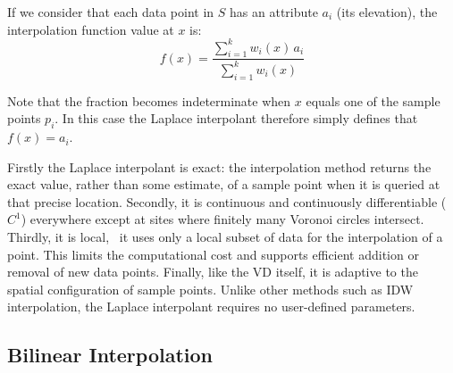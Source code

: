 %

If we consider that each data point in $S$ has an attribute $a_{i}$ (its elevation), the interpolation function value at $x$ is:
\begin{equation}
  f(x) = \frac{\sum_{i=1}^{k} w_{i}(x) \, a_{i}}{\sum_{i=1}^{k} w_{i}(x)}
  \label{eq:laplace2}
\end{equation}

Note that the fraction becomes indeterminate when $x$ equals one of the sample points $p_i$. 
In this case the Laplace interpolant therefore simply defines that $f(x) = a_i$.

%

Firstly the Laplace interpolant is exact: the interpolation method returns the exact value, rather than some estimate, of a sample point when it is queried at that precise location. 
Secondly, it is continuous and continuously differentiable ($C^1$) everywhere except at sites where finitely many Voronoi circles intersect. 
Thirdly, it is local, \ie\ it uses only a local subset of data for the interpolation of a point. 
This limits the computational cost and supports efficient addition or removal of new data points. 
Finally, like the VD itself, it is adaptive to the spatial configuration of sample points. 
Unlike other methods such as IDW interpolation, the Laplace interpolant requires no user-defined parameters.



\subsection{Bilinear Interpolation}%

